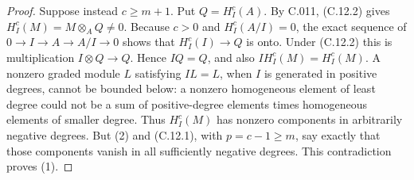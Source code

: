 \begin{proof}
Suppose instead $c\geq m+1$. Put $Q=H_I^c(A)$.
By C.011, (C.12.2) gives $H_I^c(M)=M\otimes_A Q\ne0$.
Because $c>0$ and $H_I^c(A/I)=0$, the exact sequence of $0\to I\to A\to A/I\to0$
shows that $H_I^c(I)\to Q$ is onto. Under (C.12.2) this is multiplication
$I\otimes Q\to Q$. Hence $IQ=Q$, and also
$I H_I^c(M)=H_I^c(M)$.
A nonzero graded module $L$ satisfying $IL=L$, when $I$ is generated in
positive degrees, cannot be bounded below: a nonzero homogeneous element
of least degree could not be a sum of positive-degree elements times
homogeneous elements of smaller degree. Thus $H_I^c(M)$ has nonzero
components in arbitrarily negative degrees.
But (2) and (C.12.1), with $p=c-1\geq m$, say exactly that those components
vanish in all sufficiently negative degrees. This contradiction proves (1).
\end{proof}

